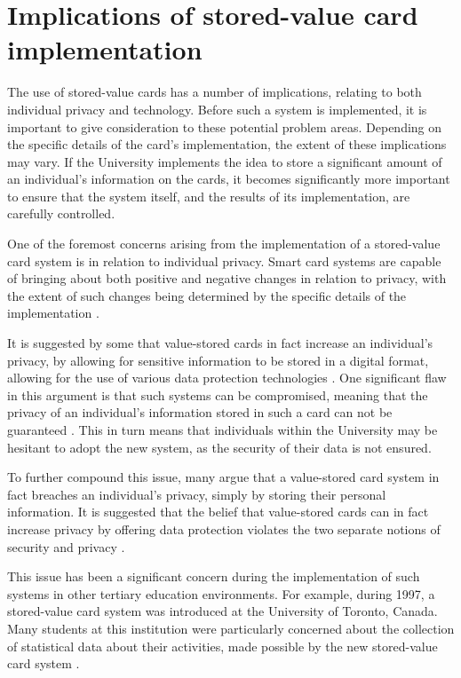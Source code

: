 \section{Implications of stored-value card implementation}

The use of stored-value cards has a number of implications, relating to both individual privacy and technology. Before such a system is implemented, it is important to give consideration to these potential problem areas. Depending on the specific details of the card's implementation, the extent of these implications may vary. If the University implements the idea to store a significant amount of an individual's information on the cards, it becomes significantly more important to ensure that the system itself, and the results of its implementation, are carefully controlled.

One of the foremost concerns arising from the implementation of a stored-value card system is in relation to individual privacy. Smart card systems are capable of bringing about both positive and negative changes in relation to privacy, with the extent of such changes being determined by the specific details of the implementation \cite{clarke}. 

It is suggested by some that value-stored cards in fact increase an individual's privacy, by allowing for sensitive information to be stored in a digital format, allowing for the use of various data protection technologies \cite{everett}. One significant flaw in this argument is that such systems can be compromised, meaning that the privacy of an individual's information stored in such a card can not be guaranteed \cite{kanninen}. This in turn means that individuals within the University may be hesitant to adopt the new system, as the security of their data is not ensured.

To further compound this issue, many argue that a value-stored card system in fact breaches an individual's privacy, simply by storing their personal information. It is suggested that the belief that value-stored cards can in fact increase privacy by offering data protection violates the two separate notions of security and privacy \cite{clarke}. 

This issue has been a significant concern during the implementation of such systems in other tertiary education environments. For example, during 1997, a stored-value card system was introduced at the University of Toronto, Canada. Many students at this institution were particularly concerned about the collection of statistical data about their activities, made possible by the new stored-value card system \cite{bozak}.


